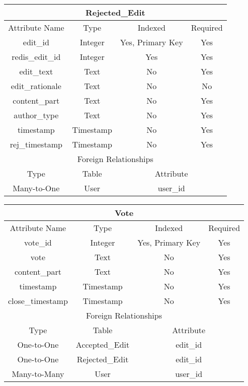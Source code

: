 \documentclass[12pt,letterpaper]{article}
\begin{document}
\begin{center}
\label{RejectedEdit}
\begin{tabular}{|c|c|c|c|}
\hline
\multicolumn{4}{|c|}{Rejected\_Edit} \\ \hline
Attribute Name & Type & Indexed & Required \\ \hline
edit\_id & Integer & Yes, Primary Key & Yes \\ \hline
redis\_edit\_id & Integer & Yes & Yes \\ \hline
edit\_text & Text & No & Yes \\ \hline
edit\_rationale & Text & No & No \\ \hline
content\_part & Text & No & Yes \\ \hline
author\_type & Text & No & Yes \\ \hline %
timestamp & Timestamp & No & Yes \\ \hline
rej\_timestamp & Timestamp & No & Yes \\ \hline
\multicolumn{4}{|c|}{Foreign Relationships} \\ \hline
Type & Table & \multicolumn{2}{c|}{Attribute} \\ \hline
Many-to-One & User & \multicolumn{2}{c|}{user\_id} \\ \hline %
\end{tabular}
\end{center}


\vspace*{.5cm}
\begin{center}
\label{Vote}
\begin{tabular}{|c|c|c|c|}
\hline
\multicolumn{4}{|c|}{Vote} \\ \hline
Attribute Name & Type & Indexed & Required \\ \hline
vote\_id & Integer & Yes, Primary Key & Yes \\ \hline
vote & Text & No & Yes \\ \hline	%
content\_part & Text & No & Yes \\ \hline %
timestamp & Timestamp & No & Yes \\ \hline
close\_timestamp & Timestamp & No & Yes \\ \hline	%
\multicolumn{4}{|c|}{Foreign Relationships} \\ \hline
Type & Table & \multicolumn{2}{c|}{Attribute} \\ \hline
One-to-One & Accepted\_Edit & \multicolumn{2}{c|}{edit\_id} \\ \hline %
One-to-One & Rejected\_Edit & \multicolumn{2}{c|}{edit\_id} \\ \hline %
Many-to-Many & User & \multicolumn{2}{c|}{user\_id} \\ \hline %
\end{tabular}
\end{center}
\end{document}
